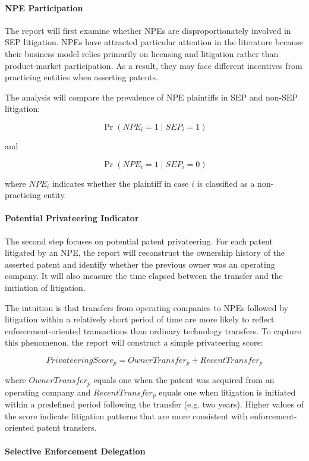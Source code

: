 \documentclass[12pt]{article}
\begin{document}
\paragraph{NPE Participation}

The report will first examine whether NPEs are disproportionately involved in SEP litigation. NPEs have attracted particular attention in the literature because their business model relies primarily on licensing and litigation rather than product-market participation. As a result, they may face different incentives from practicing entities when asserting patents.

The analysis will compare the prevalence of NPE plaintiffs in SEP and non-SEP litigation:

\[
\Pr(NPE_i = 1 \mid SEP_i = 1)
\]

and

\[
\Pr(NPE_i = 1 \mid SEP_i = 0)
\]

where \(NPE_i\) indicates whether the plaintiff in case \(i\) is classified as a non-practicing entity.

\paragraph{Potential Privateering Indicator}

The second step focuses on potential patent privateering. For each patent litigated by an NPE, the report will reconstruct the ownership history of the asserted patent and identify whether the previous owner was an operating company. It will also measure the time elapsed between the transfer and the initiation of litigation.

The intuition is that transfers from operating companies to NPEs followed by litigation within a relatively short period of time are more likely to reflect enforcement-oriented transactions than ordinary technology transfers. To capture this phenomenon, the report will construct a simple privateering score:

\[
PrivateeringScore_p =
OwnerTransfer_p + RecentTransfer_p
\]

where \(OwnerTransfer_p\) equals one when the patent was acquired from an operating company and \(RecentTransfer_p\) equals one when litigation is initiated within a predefined period following the transfer (e.g. two years). Higher values of the score indicate litigation patterns that are more consistent with enforcement-oriented patent transfers.

\paragraph{Selective Enforcement Delegation}
\end{document}
